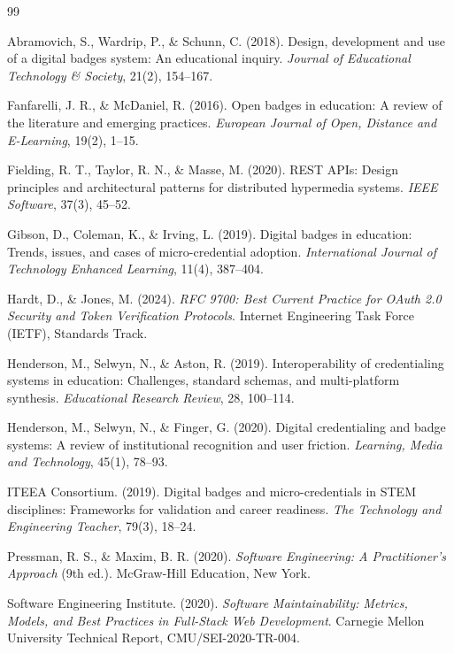 \documentclass[12pt,a4paper]{article}
\begin{document}
\begin{thebibliography}{99}

Abramovich, S., Wardrip, P., \& Schunn, C. (2018). Design, development and use of a digital badges system: An educational inquiry. \textit{Journal of Educational Technology \& Society}, 21(2), 154--167.

Fanfarelli, J. R., \& McDaniel, R. (2016). Open badges in education: A review of the literature and emerging practices. \textit{European Journal of Open, Distance and E-Learning}, 19(2), 1--15.

Fielding, R. T., Taylor, R. N., \& Masse, M. (2020). REST APIs: Design principles and architectural patterns for distributed hypermedia systems. \textit{IEEE Software}, 37(3), 45--52.

Gibson, D., Coleman, K., \& Irving, L. (2019). Digital badges in education: Trends, issues, and cases of micro-credential adoption. \textit{International Journal of Technology Enhanced Learning}, 11(4), 387--404.

Hardt, D., \& Jones, M. (2024). \textit{RFC 9700: Best Current Practice for OAuth 2.0 Security and Token Verification Protocols}. Internet Engineering Task Force (IETF), Standards Track.

Henderson, M., Selwyn, N., \& Aston, R. (2019). Interoperability of credentialing systems in education: Challenges, standard schemas, and multi-platform synthesis. \textit{Educational Research Review}, 28, 100--114.

Henderson, M., Selwyn, N., \& Finger, G. (2020). Digital credentialing and badge systems: A review of institutional recognition and user friction. \textit{Learning, Media and Technology}, 45(1), 78--93.

ITEEA Consortium. (2019). Digital badges and micro-credentials in STEM disciplines: Frameworks for validation and career readiness. \textit{The Technology and Engineering Teacher}, 79(3), 18--24.

Pressman, R. S., \& Maxim, B. R. (2020). \textit{Software Engineering: A Practitioner's Approach} (9th ed.). McGraw-Hill Education, New York.

Software Engineering Institute. (2020). \textit{Software Maintainability: Metrics, Models, and Best Practices in Full-Stack Web Development}. Carnegie Mellon University Technical Report, CMU/SEI-2020-TR-004.

\end{thebibliography}
\endgroup
\end{document}
